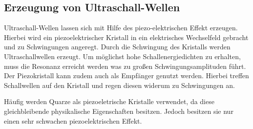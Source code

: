 \subsection{Erzeugung von Ultraschall-Wellen}
Ultraschall-Wellen lassen sich mit Hilfe des piezo-elektrischen Effekt erzeugen.
Hierbei wird ein piezoelektrischer Kristall in ein elektrisches Wechselfeld
gebracht und zu Schwingungen angeregt. Durch die Schwingung des Kristalls werden
Ultraschallwellen erzeugt. Um möglichst hohe Schallenergiedichten zu erhalten,
muss die Resonanz erreicht werden was zu großen Schwingungsamplituden führt.
Der Piezokristall kann zudem auch als Empfänger genutzt werden. Hierbei treffen
Schallwellen auf den Kristall und regen diesen widerum zu Schwingungen an.

Häufig werden Quarze als piezoeletrische Kristalle verwendet, da diese
gleichbleibende physikalische Eigenschaften besitzen. Jedoch besitzen sie nur
einen sehr schwachen piezoelektrischen Effekt.
